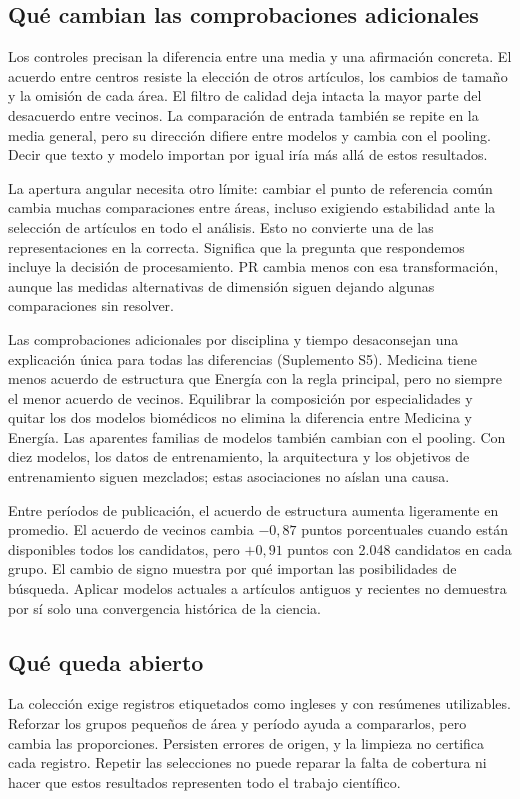 \documentclass[12pt]{article}
\begin{document}
\subsection{Qué cambian las comprobaciones adicionales}
Los controles precisan la diferencia entre una media y una afirmación concreta. El acuerdo entre centros resiste la elección de otros artículos, los cambios de tamaño y la omisión de cada área. El filtro de calidad deja intacta la mayor parte del desacuerdo entre vecinos. La comparación de entrada también se repite en la media general, pero su dirección difiere entre modelos y cambia con el pooling. Decir que texto y modelo importan por igual iría más allá de estos resultados.

La apertura angular necesita otro límite: cambiar el punto de referencia común cambia muchas comparaciones entre áreas, incluso exigiendo estabilidad ante la selección de artículos en todo el análisis. Esto no convierte una de las representaciones en la correcta. Significa que la pregunta que respondemos incluye la decisión de procesamiento. PR cambia menos con esa transformación, aunque las medidas alternativas de dimensión siguen dejando algunas comparaciones sin resolver.

Las comprobaciones adicionales por disciplina y tiempo desaconsejan una explicación única para todas las diferencias (Suplemento S5). Medicina tiene menos acuerdo de estructura que Energía con la regla principal, pero no siempre el menor acuerdo de vecinos. Equilibrar la composición por especialidades y quitar los dos modelos biomédicos no elimina la diferencia entre Medicina y Energía. Las aparentes familias de modelos también cambian con el pooling. Con diez modelos, los datos de entrenamiento, la arquitectura y los objetivos de entrenamiento siguen mezclados; estas asociaciones no aíslan una causa.

Entre períodos de publicación, el acuerdo de estructura aumenta ligeramente en promedio. El acuerdo de vecinos cambia $-0,87$ puntos porcentuales cuando están disponibles todos los candidatos, pero $+0,91$ puntos con 2.048 candidatos en cada grupo. El cambio de signo muestra por qué importan las posibilidades de búsqueda. Aplicar modelos actuales a artículos antiguos y recientes no demuestra por sí solo una convergencia histórica de la ciencia.

\subsection{Qué queda abierto}
La colección exige registros etiquetados como ingleses y con resúmenes utilizables. Reforzar los grupos pequeños de área y período ayuda a compararlos, pero cambia las proporciones. Persisten errores de origen, y la limpieza no certifica cada registro. Repetir las selecciones no puede reparar la falta de cobertura ni hacer que estos resultados representen todo el trabajo científico.
\end{document}
